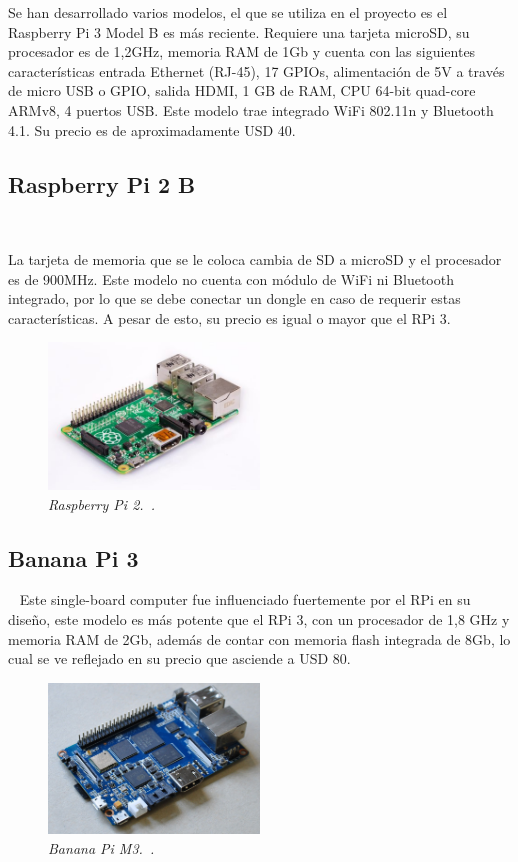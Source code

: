 Se han desarrollado varios modelos, el que se utiliza en el proyecto es el Raspberry Pi 3 Model B es más reciente.
Requiere una tarjeta microSD, su procesador es de 1,2GHz, memoria RAM de 1Gb y cuenta con las siguientes características entrada Ethernet (RJ-45), 17 GPIOs, alimentación de 5V a través de micro USB o GPIO, salida HDMI, 1 GB de RAM, CPU 64-bit quad-core ARMv8, 4 puertos USB.
Este modelo trae integrado WiFi 802.11n y Bluetooth 4.1.
Su precio es de aproximadamente USD 40.

\subsection{Raspberry Pi 2 B} ~

La tarjeta de memoria que se le coloca cambia de SD a microSD y el procesador es de 900MHz. Este modelo no cuenta con módulo de WiFi ni Bluetooth integrado, por lo que se debe conectar un dongle en caso de requerir estas características. A pesar de esto, su precio es igual o mayor que el RPi 3.

\begin{figure}[h!]
  \centering
  \includegraphics[width=0.5\textwidth, keepaspectratio]{images/rpi2}
  \caption{\textit{Raspberry Pi 2.~\cite{RPi2}.}}
  \label{fig:rpi2}
\end{figure}

\subsection{Banana Pi 3} ~
Este single-board computer fue influenciado fuertemente por el RPi en su diseño, este modelo es más potente que el RPi 3, con un procesador de 1,8 GHz y memoria RAM de 2Gb, además de contar con memoria flash integrada de 8Gb, lo cual se ve reflejado en su precio que asciende a USD 80. 

\begin{figure}[h!]
  \centering
  \includegraphics[width=0.5\textwidth, keepaspectratio]{images/bpi3}
  \caption{\textit{Banana Pi M3.~\cite{Banana3}.}}
  \label{fig:bpi3}
\end{figure}

